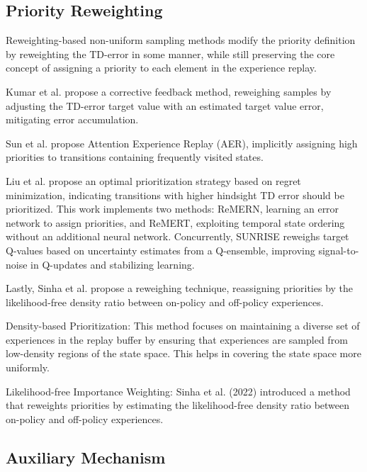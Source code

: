 
\subsection{Priority Reweighting}

Reweighting-based non-uniform sampling methods modify the priority definition by reweighting the TD-error in some manner, while still preserving the core concept of assigning a priority to each element in the experience replay.

Kumar et al. \cite{kumar2020discor}  propose a corrective feedback method, reweighing samples by adjusting the TD-error target value with an estimated target value error, mitigating error accumulation. 

Sun et al. \cite{sun2020attentive} propose Attention Experience Replay (AER), implicitly assigning high priorities to transitions containing frequently visited states. 

Liu et al. \cite{liu2021regret} propose an optimal prioritization strategy based on regret minimization, indicating transitions with higher hindsight TD error should be prioritized. This work implements two methods: ReMERN, learning an error network to assign priorities, and ReMERT, exploiting temporal state ordering without an additional neural network. Concurrently, SUNRISE \cite{lee2021sunrise} reweighs target Q-values based on uncertainty estimates from a Q-ensemble, improving signal-to-noise in Q-updates and stabilizing learning. 

Lastly, Sinha et al. \cite{sinha2022experience}  propose a reweighing technique, reassigning priorities by the likelihood-free density ratio between on-policy and off-policy experiences.


Density-based Prioritization: This method focuses on maintaining a diverse set of experiences in the replay buffer by ensuring that experiences are sampled from low-density regions of the state space. This helps in covering the state space more uniformly.

Likelihood-free Importance Weighting: Sinha et al. (2022) introduced a method that reweights priorities by estimating the likelihood-free density ratio between on-policy and off-policy experiences.


\subsection{Auxiliary Mechanism}

